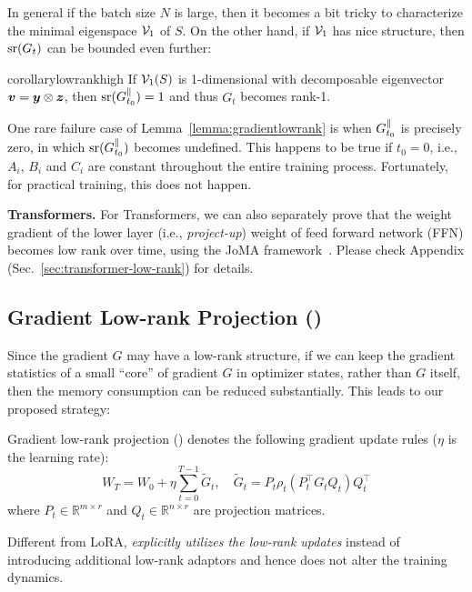 In general if the batch size $N$ is large, then it becomes a bit tricky to characterize the minimal eigenspace $\mathcal{V}_1$ of $S$. On the other hand, if $\mathcal{V}_1$ has nice structure, then $\mathrm{sr}(G_t)$ can be bounded even further: 
\begin{restatable}{corollary}{lowrankhigh}
If $\mathcal{V}_1(S)$ is 1-dimensional with decomposable eigenvector ${\bm{v}} = {\bm{y}} \otimes {\bm{z}}$, then $\mathrm{sr}(G_{t_0}^\parallel) = 1$ and thus $G_t$ becomes rank-1.
\end{restatable}

One rare failure case of Lemma~\ref{lemma:gradientlowrank} is when $G_{t_0}^\parallel$ is precisely zero, in which $\mathrm{sr}(G_{t_0}^\parallel)$ becomes undefined. This happens to be true if $t_0 = 0$, i.e., $A_i$, $B_i$ and $C_i$ are constant throughout the entire training process. Fortunately, for practical training, this does not happen. 

\def\vdelta{\boldsymbol{\Delta}}

\textbf{Transformers.} For Transformers, we can also separately prove that the weight gradient of the lower layer (i.e., \emph{project-up}) weight of feed forward network (FFN) becomes low rank over time, using the JoMA framework~\cite{tian2023joma}. Please check Appendix (Sec.~\ref{sec:transformer-low-rank}) for details.  




\subsection{Gradient Low-rank Projection (\lowrank{})}
Since the gradient $G$ may have a low-rank structure, if we can keep the gradient statistics of a small ``core'' of gradient $G$ in optimizer states, rather than $G$ itself, then the memory consumption can be reduced substantially. This leads to our proposed \lowrank{} strategy: 
\begin{definition}
Gradient low-rank projection (\textbf{\lowrank}) denotes the following gradient update rules ($\eta$ is the learning rate):
\begin{equation}
    \label{eq:represent_low_rank_updates}
    W_T = W_0 + \eta\sum_{t=0}^{T-1} \tilde G_{t}, \quad \tilde G_t = P_t \rho_t(P_t^\top G_t Q_t) Q^\top_t
\end{equation}
where $P_t \in \mathbb{R}^{m \times r}$ and $Q_t \in \mathbb{R}^{n\times r}$ are projection matrices. 
\end{definition}
Different from LoRA, \lowrank{} \textit{explicitly utilizes the low-rank updates} instead of introducing additional low-rank adaptors and hence does not alter the training dynamics. 

